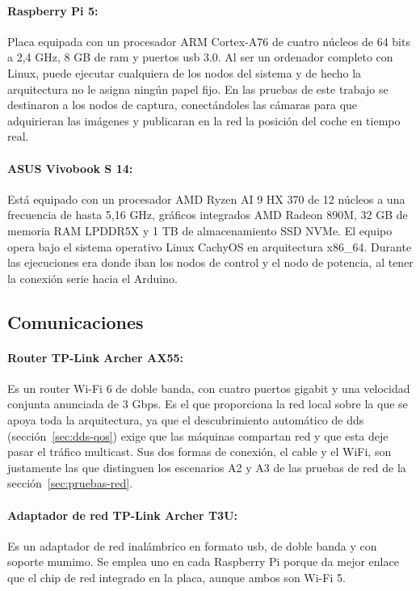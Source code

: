 \paragraph{Raspberry Pi 5:}
Placa equipada con un procesador ARM Cortex-A76 de cuatro núcleos de 64 bits a 2,4 GHz, 8 GB de \gls{ram} y puertos \gls{usb} 3.0. Al ser un ordenador completo con Linux, puede ejecutar cualquiera de los nodos del sistema y de hecho la arquitectura no le asigna ningún papel fijo. En las pruebas de este trabajo se destinaron a los nodos de captura, conectándoles las cámaras para que adquirieran las imágenes y publicaran en la red la posición del coche en tiempo real.

\paragraph{ASUS Vivobook S 14:}
Está equipado con un procesador AMD Ryzen AI 9 HX 370 de 12 núcleos a una frecuencia de hasta 5,16 GHz, gráficos integrados AMD Radeon 890M, 32 GB de memoria RAM LPDDR5X y 1 TB de almacenamiento SSD NVMe. El equipo opera bajo el sistema operativo Linux CachyOS en arquitectura x86\_64. Durante las ejecuciones era donde iban los nodos de control y el nodo de potencia, al tener la conexión serie hacia el Arduino.

\subsection{Comunicaciones}
\paragraph{Router TP-Link Archer AX55:}
\label{sec:hw-router}

Es un router Wi-Fi 6 de doble banda, con cuatro puertos gigabit y una velocidad conjunta anunciada de 3 Gbps. Es el que proporciona la red local sobre la que se apoya toda la arquitectura, ya que el descubrimiento automático de \gls{dds} (sección~\ref{sec:dds-qos}) exige que las máquinas compartan red y que esta deje pasar el tráfico multicast. Sus dos formas de conexión, el cable y el WiFi, son justamente las que distinguen los escenarios A2 y A3 de las pruebas de red de la sección~\ref{sec:pruebas-red}.

\paragraph{Adaptador de red TP-Link Archer T3U:}
\label{sec:hw-adaptador}

Es un adaptador de red inalámbrico en formato \gls{usb}, de doble banda y con soporte \gls{mumimo}. Se emplea uno en cada Raspberry Pi porque da mejor enlace que el chip de red integrado en la placa, aunque ambos son Wi-Fi 5.
